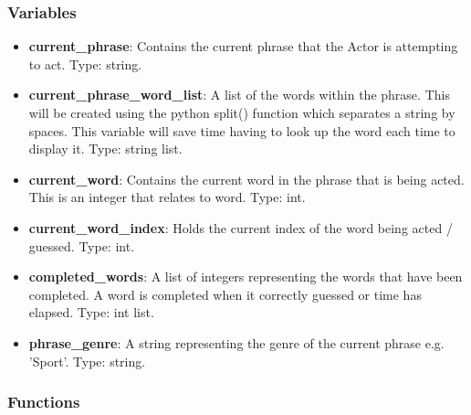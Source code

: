 \documentclass{article}
\begin{document}
\subsubsection{Variables}
\begin{itemize}

	\item \textbf{current\_phrase}: Contains the current phrase that the Actor is attempting to act. Type: string.
	
	\item \textbf{current\_phrase\_word\_list}: A list of the words within the phrase. This will be created using the python split() function which separates a string by spaces. This variable will save time having to look up the word each time to display it. Type: string list.

	\item \textbf{current\_word}: Contains the current word in the phrase that is being acted. This is an integer that relates to word. Type: int.
	
	\item \textbf{current\_word\_index}: Holds the current index of the word being acted / guessed. Type: int.
	
	\item \textbf{completed\_words}: A list of integers representing the words that have been completed. A word is completed when it correctly guessed or time has elapsed. Type: int list.
	
	\item \textbf{phrase\_genre}: A string representing the genre of the current phrase e.g. 'Sport'. Type: string.
	
\end{itemize}

\subsubsection{Functions}
\end{document}

